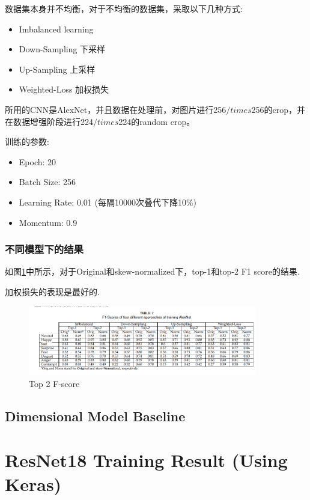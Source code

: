 \documentclass[11pt, a4paper]{article}
\begin{document}
\begin{CJK}{UTF8}{gbsn}
数据集本身并不均衡，对于不均衡的数据集，采取以下几种方式:

\begin{itemize}
\item Imbalanced learning
\item Down-Sampling 下采样
\item Up-Sampling 上采样
\item Weighted-Loss 加权损失
\end{itemize}

所用的CNN是AlexNet，并且数据在处理前，对图片进行256$/times$256的crop，并在数据增强阶段进行224$/times$224的random crop。

训练的参数:

\begin{itemize}
\item Epoch: 20
\item Batch Size: 256
\item Learning Rate: 0.01 (每隔10000次叠代下降10\%)
\item Momentum: 0.9
\end{itemize}

\subsubsection{不同模型下的结果}

如图\ref{Fig:t7}中所示，对于Original和skew-normalized下，top-1和top-2 F1 score的结果.

加权损失的表现是最好的.

\newpage

 \begin{figure}[htbp]
	
	\centering %
	\includegraphics[width=10cm]{fscore}
	
	\caption{Top 2 F-score}
	\label{Fig:t7}
	
\end{figure}

\subsection{Dimensional Model Baseline}

\section{ResNet18 Training Result (Using Keras)}

	
	
	

\end{CJK}
\end{document}
